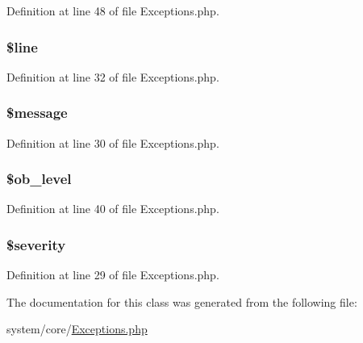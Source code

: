 Definition at line 48 of file Exceptions.\-php.

\hypertarget{class_c_i___exceptions_a52f469b0182d9abac2d0f20548680c9c}{
\subsubsection[{\$line}]{\setlength{\rightskip}{0pt plus 5cm}\$line}}\label{class_c_i___exceptions_a52f469b0182d9abac2d0f20548680c9c}


Definition at line 32 of file Exceptions.\-php.

\hypertarget{class_c_i___exceptions_abf17cb2dba2ed17cb28aa5f37deb5293}{
\subsubsection[{\$message}]{\setlength{\rightskip}{0pt plus 5cm}\$message}}\label{class_c_i___exceptions_abf17cb2dba2ed17cb28aa5f37deb5293}


Definition at line 30 of file Exceptions.\-php.

\hypertarget{class_c_i___exceptions_abb6b6587dbaf0238bf26829c8df05d59}{
\subsubsection[{\$ob\-\_\-level}]{\setlength{\rightskip}{0pt plus 5cm}\$ob\-\_\-level}}\label{class_c_i___exceptions_abb6b6587dbaf0238bf26829c8df05d59}


Definition at line 40 of file Exceptions.\-php.

\hypertarget{class_c_i___exceptions_a85759894d444d7191251479d87eaf8c6}{
\subsubsection[{\$severity}]{\setlength{\rightskip}{0pt plus 5cm}\$severity}}\label{class_c_i___exceptions_a85759894d444d7191251479d87eaf8c6}


Definition at line 29 of file Exceptions.\-php.



The documentation for this class was generated from the following file\-:\begin{DoxyCompactItemize}
\item 
system/core/\hyperlink{_exceptions_8php}{Exceptions.\-php}\end{DoxyCompactItemize}
